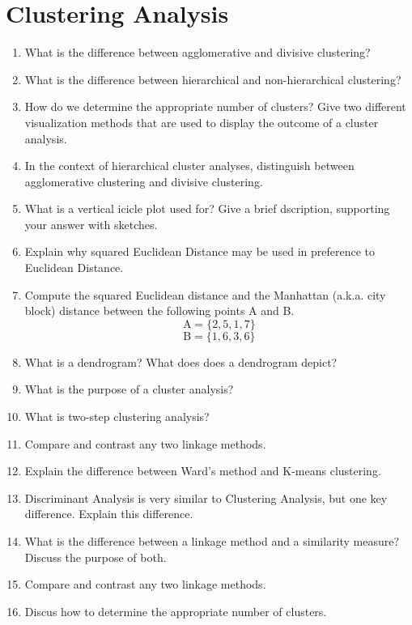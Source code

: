 \documentclass[a4paper,12pt]{article}
\begin{document}
\section*{Clustering Analysis}
\begin{enumerate}
\item What is the difference between agglomerative and divisive clustering?
\item What is the difference between hierarchical and non-hierarchical clustering?
\item How do we determine the appropriate number of clusters?  Give two different visualization methods that are used to display the outcome of a cluster analysis.

\item In the context of hierarchical cluster analyses, distinguish between agglomerative clustering and divisive clustering.
\item What is a vertical icicle plot used for? Give a brief dscription, supporting your answer
with sketches.

\item Explain why squared Euclidean Distance may be used in preference to Euclidean Distance.
\item Compute the squared Euclidean distance and the Manhattan (a.k.a. city block) distance between the following points A and B.
\[ \mbox{A} =\{2,5,1,7\}  \]
\[ \mbox{B} =\{1,6,3,6\}  \]
\item What is a dendrogram? What does does a dendrogram depict?%
\item What is the purpose of a cluster analysis? %

\item What is two-step clustering analysis?

\item Compare and contrast any two linkage methods. %

\item Explain the difference between Ward's method and K-means clustering.%
\item Discriminant Analysis is very similar to Clustering Analysis, but one key difference. Explain this difference.%
\item What is the difference between a linkage method and a similarity measure? Discuss the purpose of both.%
\item Compare and contrast any two linkage methods.
\item Discus how to determine the appropriate number of clusters.
\end{enumerate}
\end{document}
